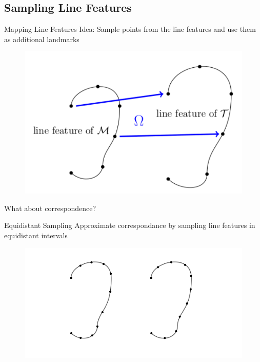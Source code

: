 \documentclass[xcolor=x11names,compress]{beamer}
\begin{document}
    \subsection{Sampling Line Features}
    \begin{frame}{Mapping Line Features}
        Idea: Sample points from the line features and use them as additional landmarks
        \begin{figure}
            \centering
            \includegraphics[width=.5\textwidth]{../resources/img/linefeaturemapping.pdf}
        \end{figure}
        What about correspondence?
    \end{frame}

    \begin{frame}{Equidistant Sampling}
        Approximate correspondance by sampling line features in equidistant intervals
        \begin{figure}
            \centering
            \includegraphics[width=.7\textwidth]{../resources/figures/ears_diffparam.pdf}
        \end{figure}
    \end{frame}
\end{document}
